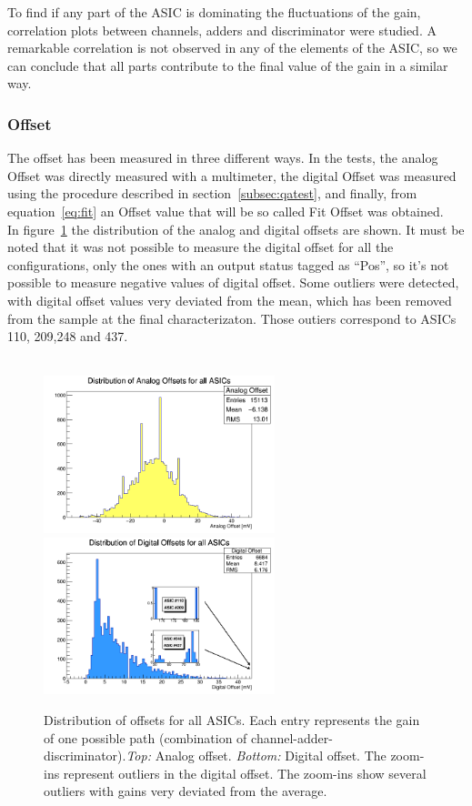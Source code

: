 \documentclass[a4paper,10pt]{book}
\begin{document}
To find if any part of the ASIC is dominating the fluctuations of the gain, correlation plots between channels, adders and discriminator were studied. A remarkable correlation is not observed in any
of the elements of the ASIC, so we can conclude that all parts contribute to the final value of the gain in a similar way. 


\subsubsection{Offset}

The offset has been measured in three different ways. In the tests, the analog Offset was directly measured with a multimeter, the digital Offset was measured using the procedure described in section~\ref{subsec:qatest},
and finally, from equation~\ref{eq:fit} an Offset value that will be so called Fit Offset was obtained.\\

In figure~\ref{fig:offsetdist}  the distribution of the analog and digital offsets are shown. It must be noted that it was not possible to measure the digital offset for all the configurations, only the ones with an output 
status tagged as ``Pos'', so it's not possible to measure negative values of digital offset. Some outliers were detected, with digital offset values very deviated from the mean, which has been removed from the sample at the final characterizaton. Those outiers correspond to ASICs 110,
209,248 and 437.\\\\
\begin{figure}
\centering
 \includegraphics[width=0.6\textwidth]{./analogdist.png}
  \includegraphics[width=0.6\textwidth]{./digitaldist.png}
  \caption{Distribution of offsets for all ASICs. Each entry represents the gain of one possible path (combination of channel-adder-discriminator).\textit{Top:} Analog offset. \textit{Bottom:}
  Digital offset. The zoom-ins represent outliers in the digital offset.  
  The zoom-ins show several outliers with gains very deviated from the average. }
    \label{fig:offsetdist}
\end{figure}
\end{document}
